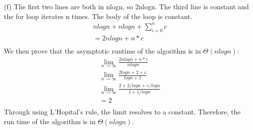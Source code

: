 \documentclass{assignment}
\begin{document}
\begin{problemlist}
\begin{answer}
(f) The first two lines are both in nlogn, so 2nlogn. The third line is constant and the for loop iterates n times. The body of the loop is constant.
\begin {align*}
&nlogn + nlogn + \sum_{i=0}^{n} c\\
&= 2nlogn + n * c\\
\end{align*}
We then prove that the asymptotic runtime of the algorithm is in $\Theta (nlogn)$:\\
\begin{align*}
&\lim_{n\rightarrow \infty} \frac{2nlogn + n * c}{nlogn}\\
&\lim_{n\rightarrow \infty} \frac{2logn + 2 + c}{logn + 1}\\
&\lim_{n\rightarrow \infty} \frac{2 + 2/logn + c/logn}{1 + 1/logn}\\
&= 2\\
\end {align*}
Through using L'Hopital's rule, the limit resolves to a constant. Therefore, the run time of the algorithm is in $\Theta (nlogn).$
\end{answer}

\end{problemlist}
\end{document}
